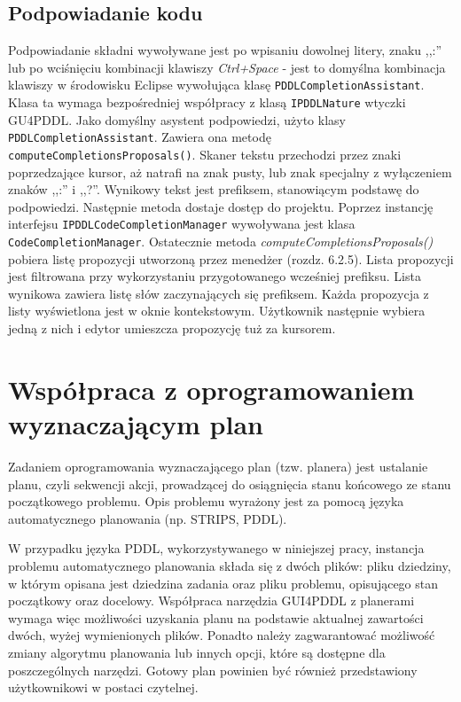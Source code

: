 \subsection{Podpowiadanie kodu}
Podpowiadanie składni wywoływane jest po wpisaniu dowolnej litery, znaku ,,:'' lub po wciśnięciu kombinacji klawiszy \emph{Ctrl+Space} - jest to domyślna kombinacja klawiszy w środowisku Eclipse wywołująca klasę \texttt{PDDLCompletionAssistant}. Klasa ta wymaga bezpośredniej współpracy z klasą \texttt{IPDDLNature} wtyczki GU4PDDL. Jako domyślny asystent podpowiedzi, użyto klasy \texttt{PDDLCompletionAssistant}. Zawiera ona metodę \texttt{computeCompletionsProposals()}. Skaner tekstu przechodzi przez znaki poprzedzające kursor, aż natrafi na znak pusty, lub znak specjalny z wyłączeniem znaków ,,:'' i ,,?''. Wynikowy tekst jest prefiksem, stanowiącym podstawę do podpowiedzi. Następnie metoda dostaje dostęp do projektu. Poprzez instancję interfejsu \texttt{IPDDLCodeCompletionManager} wywoływana jest klasa \texttt{CodeCompletionManager}. Ostatecznie metoda \emph{computeCompletionsProposals()} pobiera listę propozycji utworzoną przez menedżer (rozdz. 6.2.5). Lista propozycji jest filtrowana przy wykorzystaniu przygotowanego wcześniej prefiksu. Lista wynikowa zawiera listę słów zaczynających się prefiksem. Każda propozycja z listy wyświetlona jest w oknie kontekstowym. Użytkownik następnie wybiera jedną z nich i edytor umieszcza propozycję tuż za kursorem.





\section{Współpraca z oprogramowaniem wyznaczającym plan}
\label{sec:wspolpraca}
Zadaniem oprogramowania wyznaczającego plan (tzw. planera) jest ustalanie planu, czyli sekwencji akcji, prowadzącej do osiągnięcia stanu końcowego ze stanu początkowego problemu. Opis problemu wyrażony jest za pomocą języka automatycznego planowania (np. STRIPS, PDDL). 

W przypadku języka PDDL, wykorzystywanego w niniejszej pracy, instancja problemu automatycznego planowania składa się z dwóch plików: pliku dziedziny, w którym opisana jest dziedzina zadania oraz pliku problemu, opisującego stan początkowy oraz docelowy. Współpraca narzędzia GUI4PDDL z planerami wymaga więc możliwości uzyskania planu na podstawie aktualnej zawartości dwóch, wyżej wymienionych plików. Ponadto należy zagwarantować możliwość zmiany algorytmu planowania lub innych opcji, które są dostępne dla poszczególnych narzędzi. Gotowy plan powinien być również przedstawiony użytkownikowi w postaci czytelnej.

